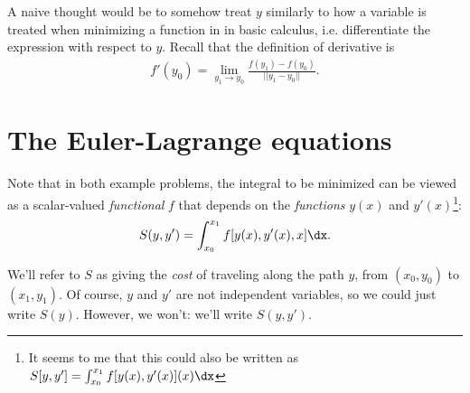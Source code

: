 A naive thought would be to somehow treat $y$ similarly to how a variable is treated when minimizing
a function in in basic calculus, i.e. differentiate the expression with respect to $y$. Recall that
the definition of derivative is
\begin{align*}
  f'(y_0) = \lim_{y_1 \to y_0}\frac{f(y_1) - f(y_0)}{||y_1 - y_0||}.
\end{align*}


\section{The Euler-Lagrange equations}

Note that in both example problems, the integral to be minimized can be viewed as a scalar-valued
\emph{functional} $f$ that depends on the \emph{functions} $y(x)$ and $y'(x)$\footnote{It seems to
  me that this could also be written as $S[y, y'] = \int _{x_0}^{x_1} f[y(x), y'(x)](x) \dx$}:
\begin{align*}
  S(y, y') = \int_{x_0}^{x_1} f[y(x), y'(x), x] \dx.
\end{align*}

We'll refer to $S$ as giving the \emph{cost} of traveling along the path $y$, from $(x_0, y_0)$ to
$(x_1, y_1)$. Of course, $y$ and $y'$ are not independent variables, so we could just write $S(y)$.
However, we won't: we'll write $S(y, y')$.


